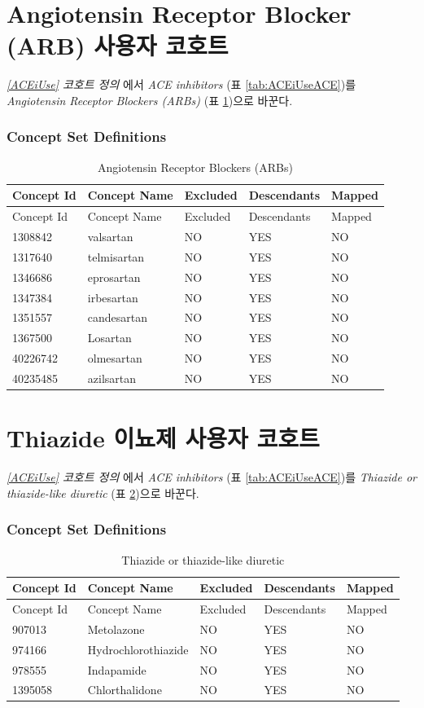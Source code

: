 \documentclass[10.5pt]{book}
\theoremstyle{definition}
\theoremstyle{definition}
\theoremstyle{definition}
\theoremstyle{remark}
\begin{document}
\section{Angiotensin Receptor Blocker (ARB) 사용자 코호트}\label{ARBUse}

\emph{\ref{ACEiUse} 코호트 정의} 에서 \emph{ACE inhibitors} (표
\ref{tab:ACEiUseACE})를 \emph{Angiotensin Receptor Blockers (ARBs)} (표
\ref{tab:ARBUseARBs})으로 바꾼다.

\subsubsection*{Concept Set
Definitions}\label{concept-set-definitions-7}

\begin{longtable}[]{@{}lllll@{}}
\caption{\label{tab:ARBUseARBs} Angiotensin Receptor Blockers
(ARBs)}\tabularnewline
\toprule
Concept Id & Concept Name & Excluded & Descendants &
Mapped\tabularnewline
\midrule
\endfirsthead
\toprule
Concept Id & Concept Name & Excluded & Descendants &
Mapped\tabularnewline
\midrule
\endhead
1308842 & valsartan & NO & YES & NO\tabularnewline
1317640 & telmisartan & NO & YES & NO\tabularnewline
1346686 & eprosartan & NO & YES & NO\tabularnewline
1347384 & irbesartan & NO & YES & NO\tabularnewline
1351557 & candesartan & NO & YES & NO\tabularnewline
1367500 & Losartan & NO & YES & NO\tabularnewline
40226742 & olmesartan & NO & YES & NO\tabularnewline
40235485 & azilsartan & NO & YES & NO\tabularnewline
\bottomrule
\end{longtable}

\section{Thiazide 이뇨제 사용자 코호트}\label{THZUse}

\emph{\ref{ACEiUse} 코호트 정의} 에서 \emph{ACE inhibitors} (표
\ref{tab:ACEiUseACE})를 \emph{Thiazide or thiazide-like diuretic} (표
\ref{tab:THZUseTHZ})으로 바꾼다.

\subsubsection*{Concept Set
Definitions}\label{concept-set-definitions-8}

\begin{longtable}[]{@{}lllll@{}}
\caption{\label{tab:THZUseTHZ} Thiazide or thiazide-like
diuretic}\tabularnewline
\toprule
Concept Id & Concept Name & Excluded & Descendants &
Mapped\tabularnewline
\midrule
\endfirsthead
\toprule
Concept Id & Concept Name & Excluded & Descendants &
Mapped\tabularnewline
\midrule
\endhead
907013 & Metolazone & NO & YES & NO\tabularnewline
974166 & Hydrochlorothiazide & NO & YES & NO\tabularnewline
978555 & Indapamide & NO & YES & NO\tabularnewline
1395058 & Chlorthalidone & NO & YES & NO\tabularnewline
\bottomrule
\end{longtable}
\end{document}
